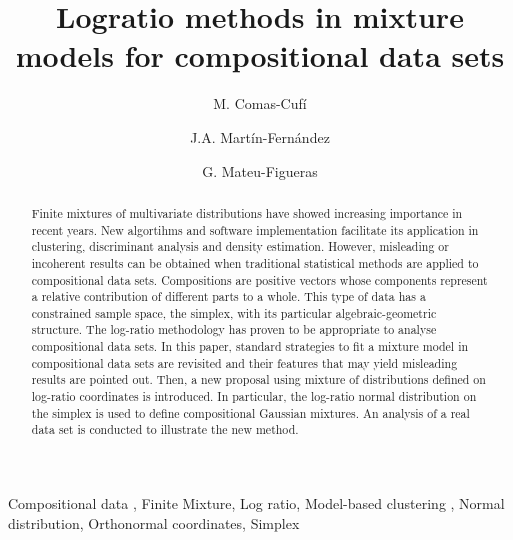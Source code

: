 \documentclass[preprint, review, 3p, authoryear]{elsarticle}
\begin{document}
\begin{frontmatter}

\title{Logratio methods in mixture models for compositional data sets}


\author[imae]{M. Comas-Cufí}
\author[imae]{J.A. Martín-Fernández}
\author[imae]{G. Mateu-Figueras}

\address[imae]{Department of Computer Science, Applied Mathematics and Statistics,\\ University of Girona, Spain}

\begin{abstract}
Finite mixtures of multivariate distributions have showed increasing importance in recent years. New algortihms and software implementation facilitate its application in clustering, discriminant analysis and density estimation. 
However, misleading or incoherent results can be obtained when traditional statistical methods are applied to compositional data sets.
Compositions are positive vectors whose components represent a relative contribution of different parts to a whole.  This type of data has a
constrained sample space, the simplex, with its particular algebraic-geometric structure. The log-ratio methodology has proven to be appropriate to analyse compositional data sets. In this paper, standard strategies to fit a mixture model in compositional data sets are revisited and their features that may yield misleading results are pointed out. Then, a new proposal using mixture of distributions defined on log-ratio coordinates is introduced. In particular, the log-ratio normal distribution on the simplex is used to define compositional Gaussian mixtures.  An analysis of a real data set is conducted to illustrate the new method.
\end{abstract}

\begin{keyword}
Compositional data \sep
Finite Mixture\sep
Log ratio\sep
Model-based clustering \sep
Normal distribution\sep
Orthonormal coordinates\sep
Simplex
\end{keyword}

\end{frontmatter}
\end{document}
